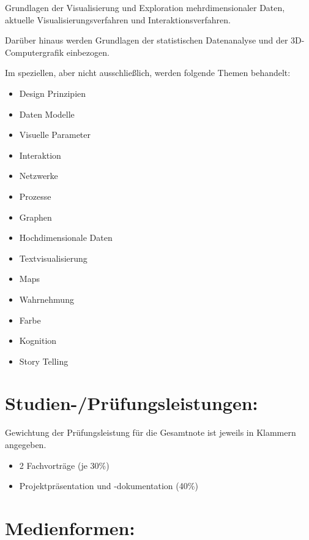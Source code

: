 Grundlagen der Visualisierung und Exploration mehrdimensionaler Daten,
aktuelle Visualisierungsverfahren und Interaktionsverfahren.

Darüber hinaus werden Grundlagen der statistischen Datenanalyse und der
3D-Computergrafik einbezogen.

Im speziellen, aber nicht ausschließlich, werden folgende Themen
behandelt:

\begin{itemize}
\tightlist
\item
  Design Prinzipien
\item
  Daten Modelle
\item
  Visuelle Parameter
\item
  Interaktion
\item
  Netzwerke
\item
  Prozesse
\item
  Graphen
\item
  Hochdimensionale Daten
\item
  Textvisualisierung
\item
  Maps
\item
  Wahrnehmung
\item
  Farbe
\item
  Kognition
\item
  Story Telling
\end{itemize}

\section*{Studien-/Prüfungsleistungen:\label{/mi-2017/modulbeschreibungen-master/MA_VC_Modul_Visualisierung}}\label{studien-pruxfcfungsleistungenpathlabelmi-2017modulbeschreibungen-mastermaux5fvcux5fmodulux5fvisualisierung}

Gewichtung der Prüfungsleistung für die Gesamtnote ist jeweils in
Klammern angegeben.

\begin{itemize}
\tightlist
\item
  2 Fachvorträge (je 30\%)
\item
  Projektpräsentation und -dokumentation (40\%)
\end{itemize}

\section*{Medienformen:\label{/mi-2017/modulbeschreibungen-master/MA_VC_Modul_Visualisierung}}\label{medienformenpathlabelmi-2017modulbeschreibungen-mastermaux5fvcux5fmodulux5fvisualisierung}

